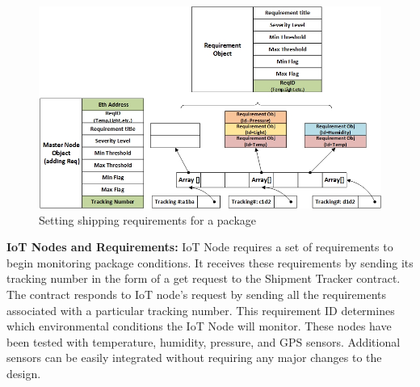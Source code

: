 \begin{figure}[h]
	\centering
    \includegraphics[width=170mm,scale=1]{figs/requirement-impl}
	\caption{Setting shipping requirements for a package}
	\label{fig:requirement-impl} 
\end{figure}

\textbf{IoT Nodes and Requirements:} 
IoT Node requires a set of requirements to begin monitoring package conditions. It receives these requirements by sending its tracking number in the form of a get request to the Shipment Tracker contract. The contract responds to IoT node’s request by sending all the requirements associated with a particular tracking number. This requirement ID determines which environmental conditions the IoT Node will monitor. These nodes have been tested with temperature, humidity, pressure, and GPS sensors. Additional sensors can be easily integrated without requiring any major changes to the design. %
\vspace{0.5cm}
